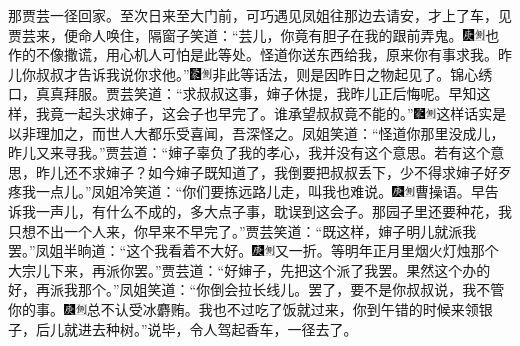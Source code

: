 那贾芸一径回家。至次日来至大门前，可巧遇见凤姐往那边去请安，才上了车，见贾芸来，便命人唤住，隔窗子笑道：“芸儿，你竟有胆子在我的跟前弄鬼。{\includegraphics[width=3mm]{../Images/00004}\includegraphics[width=3mm]{../Images/00011}\footnotesize \kaishu 也作的不像撒谎，用心机人可怕是此等处。}怪道你送东西给我，原来你有事求我。昨儿你叔叔才告诉我说你求他。”{\includegraphics[width=3mm]{../Images/00006}\includegraphics[width=3mm]{../Images/00011}\footnotesize \kaishu 非此等话法，则是因昨日之物起见了。锦心绣口，真真拜服。}贾芸笑道：“求叔叔这事，婶子休提，我昨儿正后悔呢。早知这样，我竟一起头求婶子，这会子也早完了。谁承望叔叔竟不能的。”{\includegraphics[width=3mm]{../Images/00006}\includegraphics[width=3mm]{../Images/00011}\footnotesize \kaishu 这样话实是以非理加之，而世人大都乐受喜闻，吾深怪之。}凤姐笑道：“怪道你那里没成儿，昨儿又来寻我。”贾芸道：“婶子辜负了我的孝心，我并没有这个意思。若有这个意思，昨儿还不求婶子？如今婶子既知道了，我倒要把叔叔丢下，少不得求婶子好歹疼我一点儿。”凤姐冷笑道：“你们要拣远路儿走，叫我也难说。{\includegraphics[width=3mm]{../Images/00004}\includegraphics[width=3mm]{../Images/00011}\footnotesize \kaishu 曹操语。}早告诉我一声儿，有什么不成的，多大点子事，耽误到这会子。那园子里还要种花，我只想不出一个人来，你早来不早完了。”贾芸笑道：“既这样，婶子明儿就派我罢。”凤姐半晌道：“这个我看着不大好。{\includegraphics[width=3mm]{../Images/00004}\includegraphics[width=3mm]{../Images/00011}\footnotesize \kaishu 又一折。}等明年正月里烟火灯烛那个大宗儿下来，再派你罢。”贾芸道：“好婶子，先把这个派了我罢。果然这个办的好，再派我那个。”凤姐笑道：“你倒会拉长线儿。罢了，要不是你叔叔说，我不管你的事。{\includegraphics[width=3mm]{../Images/00004}\includegraphics[width=3mm]{../Images/00011}\footnotesize \kaishu 总不认受冰麝贿。}我也不过吃了饭就过来，你到午错的时候来领银子，后儿就进去种树。”说毕，令人驾起香车，一径去了。

